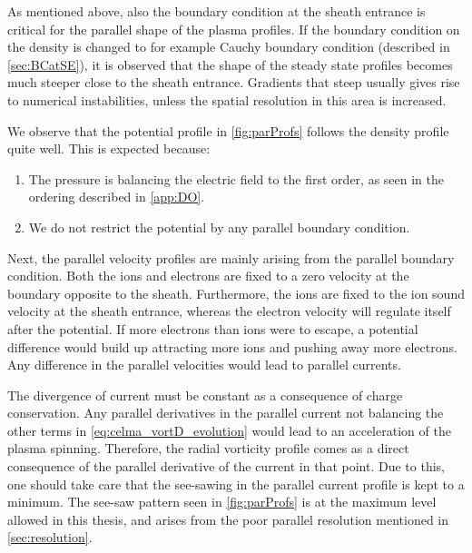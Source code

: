As mentioned above, also the boundary condition at the sheath entrance is critical for the parallel shape of the plasma profiles.
If the boundary condition on the density is changed to for example Cauchy boundary condition (described in \cref{sec:BCatSE}), it is observed that the shape of the steady state profiles becomes much steeper close to the sheath entrance.
Gradients that steep usually gives rise to numerical instabilities, unless the spatial resolution in this area is increased.

We observe that the potential profile in \cref{fig:parProfs} follows the density profile quite well.
This is expected because:
%
\begin{enumerate}[noitemsep]
        \item The pressure is balancing the electric field to the first order, as seen in the ordering described in \ref{app:DO}.
        \item We do not restrict the potential by any parallel boundary condition.
\end{enumerate}

Next, the parallel velocity profiles are mainly arising from the parallel boundary condition.
Both the ions and electrons are fixed to a zero velocity at the boundary opposite to the sheath.
Furthermore, the ions are fixed to the ion sound velocity at the sheath entrance, whereas the electron velocity will regulate itself after the potential.
If more electrons than ions were to escape, a potential difference would build up attracting more ions and pushing away more electrons.
%
%
Any difference in the parallel velocities would lead to parallel currents.

The divergence of current must be constant as a consequence of charge conservation.
Any parallel derivatives in the parallel current not balancing the other terms in \cref{eq:celma_vortD_evolution} would lead to an acceleration of the plasma spinning.
Therefore, the radial vorticity profile comes as a direct consequence of the parallel derivative of the current in that point.
Due to this, one should take care that the see-sawing in the parallel current profile is kept to a minimum.
The see-saw pattern seen in \cref{fig:parProfs} is at the maximum level allowed in this thesis, and arises from the poor parallel resolution mentioned in \ref{sec:resolution}.

